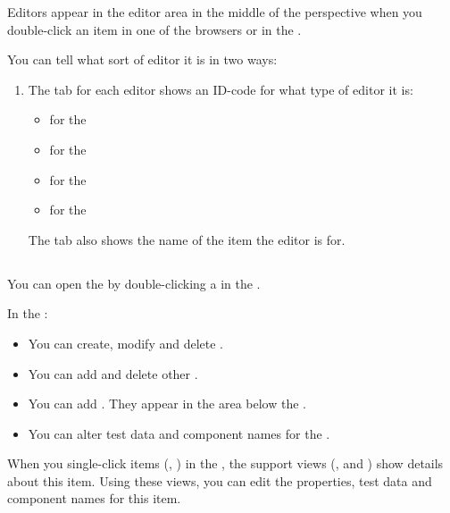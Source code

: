 Editors appear in the editor area in the middle of the perspective when you double-click an item  in one of the browsers or in the \gdnavview{}. 

You can tell what sort of editor it is in two ways:
\begin{enumerate}
\item The tab for each editor shows an ID-code for what type of editor it is:
\begin{itemize}
\item {} for the \gdtestcaseeditor{}
\item {} for the \gdtestsuiteeditor{}
\item {} for the \gdomeditor{}
\item {} for the \gddataeditor{}
\end{itemize}
The tab also shows the name of the item the editor is for. 

\end{enumerate}
 
 


\subsection{\gdtestcaseeditor{}}
You can open the \gdtestcaseeditor{} by double-clicking a \gdcase{} in the \gdtestcasebrowser{}.
 
In the \gdtestcaseeditor{}:
\begin{itemize}
\item You can create, modify and delete \gdsteps{}. 
\item You can add and delete other \gdcases{}. 
\item You can add \gdehandlers{}. They appear in the \gdehandler area below the \gdtestcaseeditor{}.  
\item You can alter test data and component names for the \gdcase{}.
\end{itemize}

When you single-click items (\gdcases{}, \gdsteps{}) in the \gdtestcaseeditor{}, the support views (\gdpropview{}, \gdcompnamesview{} and \gddatasetsview{}) show details about this item. Using these views, you can edit the properties, test data and component names for this item. 

